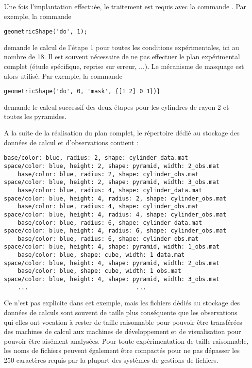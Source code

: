 Une fois l'implantation effectuée, le traitement est requis avec la commande . Par exemple, la commande
\begin{lstlisting}
geometricShape('do', 1);
\end{lstlisting}
demande le calcul de l'étape 1 pour toutes les conditions expérimentales, ici au nombre de 18. Il est souvent nécessaire de ne pas effectuer le plan expérimental complet (étude spécifique, reprise sur erreur, ...). Le mécanisme de masquage est alors utilisé. Par exemple, la commande
\begin{lstlisting}
geometricShape('do', 0, 'mask', {[1 2] 0 1})}
\end{lstlisting}
demande le calcul successif des deux étapes pour les cylindres de rayon 2 et toutes les pyramides.

A la suite de la réalisation du plan complet, le répertoire dédié au stockage des données de calcul et d'observations contient : \\
\begin{Verbatim}[fontsize=\scriptsize]
	base/color: blue, radius: 2, shape: cylinder_data.mat            space/color: blue, height: 2, shape: pyramid, width: 2_obs.mat
	base/color: blue, radius: 2, shape: cylinder_obs.mat             space/color: blue, height: 2, shape: pyramid, width: 3_obs.mat
	base/color: blue, radius: 4, shape: cylinder_data.mat            space/color: blue, height: 4, radius: 2, shape: cylinder_obs.mat
	base/color: blue, radius: 4, shape: cylinder_obs.mat             space/color: blue, height: 4, radius: 4, shape: cylinder_obs.mat
	base/color: blue, radius: 6, shape: cylinder_data.mat            space/color: blue, height: 4, radius: 6, shape: cylinder_obs.mat
	base/color: blue, radius: 6, shape: cylinder_obs.mat             space/color: blue, height: 4, shape: pyramid, width: 1_obs.mat
	base/color: blue, shape: cube, width: 1_data.mat                 space/color: blue, height: 4, shape: pyramid, width: 2_obs.mat
	base/color: blue, shape: cube, width: 1_obs.mat                  space/color: blue, height: 4, shape: pyramid, width: 3_obs.mat
	...							      ...
\end{Verbatim}

Ce n'est pas explicite dans cet exemple, mais les fichiers  dédiés au stockage des données de calculs sont souvent de taille plus conséquente que les observations qui elles ont vocation à rester de taille raisonnable pour pouvoir être transférées des machines de calcul aux machines de développement et de visualisation pour pouvoir être aisément analysées. Pour toute expérimentation de taille raisonnable, les noms de fichiers peuvent également être compactés pour ne pas dépasser les 250 caractères requis par la plupart des systèmes de gestions de fichiers.

